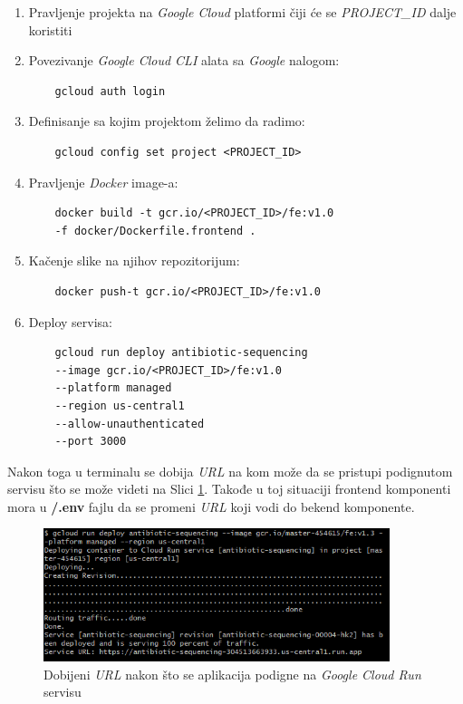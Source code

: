 \documentclass[12pt,oneside]{memoir}
\begin{document}
\begin{enumerate}
\item Pravljenje projekta na \emph{Google Cloud} platformi čiji će se \emph{PROJECT\_ID} dalje koristiti
\item Povezivanje \emph{Google Cloud CLI} alata sa \emph{Google} nalogom:
\begin{verbatim}
    gcloud auth login
\end{verbatim}
\item Definisanje sa kojim projektom želimo da radimo:
\begin{verbatim}
    gcloud config set project <PROJECT_ID>
\end{verbatim}
\item Pravljenje \emph{Docker} image-a:
\begin{verbatim}
    docker build -t gcr.io/<PROJECT_ID>/fe:v1.0 
    -f docker/Dockerfile.frontend .
\end{verbatim}
\item Kačenje slike na njihov repozitorijum:
\begin{verbatim}
    docker push-t gcr.io/<PROJECT_ID>/fe:v1.0
\end{verbatim}
\item Deploy servisa: 
\begin{verbatim}
    gcloud run deploy antibiotic-sequencing 
    --image gcr.io/<PROJECT_ID>/fe:v1.0 
    --platform managed 
    --region us-central1
    --allow-unauthenticated 
    --port 3000
\end{verbatim}
\end{enumerate}

Nakon toga u terminalu se dobija \emph{URL} na kom može da se pristupi podignutom servisu što se može videti na Slici \ref{fig:gcr_deploy}. Takođe u toj situaciji frontend komponenti mora u \textbf{/.env} fajlu da se promeni \emph{URL} koji vodi do bekend komponente.

\begin{figure}[h]
\centering
\includegraphics[width=0.9\textwidth]{images/gcr_deploy.png}
\caption{Dobijeni \emph{URL} nakon što se aplikacija podigne na \emph{Google Cloud Run} servisu}
\label{fig:gcr_deploy}
\end{figure}
\end{document}
